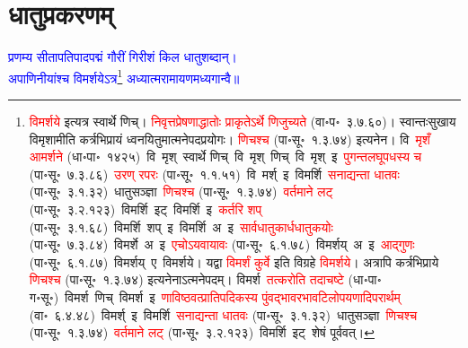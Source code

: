 %
%
%

\renewcommand\chaptername{अथ तृतीयोऽध्यायः}
\chapter[\texorpdfstring{धातुप्रकरणम्}{तृतीयोऽध्यायः}]{धातुप्रकरणम्}
\vspace{-5mm}
\fontsize{16}{24}\selectfont\centering{}\textcolor{blue}{प्रणम्य सीतापतिपादपद्मं गौरीं गिरीशं किल धातुशब्दान्।\nopagebreak\\
अपाणिनीयांश्च विमर्शयेऽत्र\footnote{\textcolor{red}{विमर्शये} इत्यत्र स्वार्थे णिच्। \textcolor{red}{निवृत्त\-प्रेषणाद्धातोः प्राकृतेऽर्थे णिजुच्यते} (वा॰प॰~३.७.६०)। स्वान्तःसुखाय विमृशामीति कर्त्रभिप्रायं ध्वनयितुमात्मने\-पदप्रयोगः। \textcolor{red}{णिचश्च} (पा॰सू॰~१.३.७४) इत्यनेन। वि~\textcolor{red}{मृशँ आमर्शने} (धा॰पा॰~१४२५)~\arrow वि~मृश्~\arrow स्वार्थे णिच्~\arrow वि~मृश्~णिच्~\arrow वि~मृश्~इ~\arrow \textcolor{red}{पुगन्त\-लघूपधस्य च} (पा॰सू॰~७.३.८६)~\arrow \textcolor{red}{उरण् रपरः} (पा॰सू॰~१.१.५१)~\arrow वि~मर्श्~इ~\arrow विमर्शि~\arrow \textcolor{red}{सनाद्यन्ता धातवः} (पा॰सू॰~३.१.३२)~\arrow धातु\-सञ्ज्ञा~\arrow \textcolor{red}{णिचश्च} (पा॰सू॰~१.३.७४)~\arrow \textcolor{red}{वर्तमाने लट्} (पा॰सू॰~३.२.१२३)~\arrow विमर्शि~इट्~\arrow विमर्शि~इ~\arrow \textcolor{red}{कर्तरि शप्‌} (पा॰सू॰~३.१.६८)~\arrow विमर्शि~शप्~इ~\arrow विमर्शि~अ~इ~\arrow \textcolor{red}{सार्वधातुकार्ध\-धातुकयोः} (पा॰सू॰~७.३.८४)~\arrow विमर्शे~अ~इ~\arrow \textcolor{red}{एचोऽयवायावः} (पा॰सू॰~६.१.७८)~\arrow विमर्शय्~अ~इ~\arrow \textcolor{red}{आद्गुणः} (पा॰सू॰~६.१.८७)~\arrow विमर्शय्~ए~\arrow विमर्शये। यद्वा \textcolor{red}{विमर्शं कुर्वे} इति विग्रहे \textcolor{red}{विमर्शये}। अत्रापि कर्त्रभिप्राये \textcolor{red}{णिचश्च} (पा॰सू॰~१.३.७४) इत्यनेनाऽत्मने\-पदम्। विमर्श~\arrow \textcolor{red}{तत्करोति तदाचष्टे} (धा॰पा॰ ग॰सू॰)~\arrow विमर्श~णिच्~\arrow विमर्श~इ~\arrow \textcolor{red}{णाविष्ठवत्प्राति\-पदिकस्य पुंवद्भाव\-रभाव\-टिलोप\-यणादि\-परार्थम्} (वा॰~६.४.४८)~\arrow विमर्श्~इ~\arrow विमर्शि~\arrow \textcolor{red}{सनाद्यन्ता धातवः} (पा॰सू॰~३.१.३२)~\arrow धातु\-सञ्ज्ञा~\arrow \textcolor{red}{णिचश्च} (पा॰सू॰~१.३.७४)~\arrow \textcolor{red}{वर्तमाने लट्} (पा॰सू॰~३.२.१२३)~\arrow विमर्शि~इट्~\arrow शेषं पूर्ववत्।} अध्यात्मरामायणमध्यगान्वै॥}\nopagebreak\\

